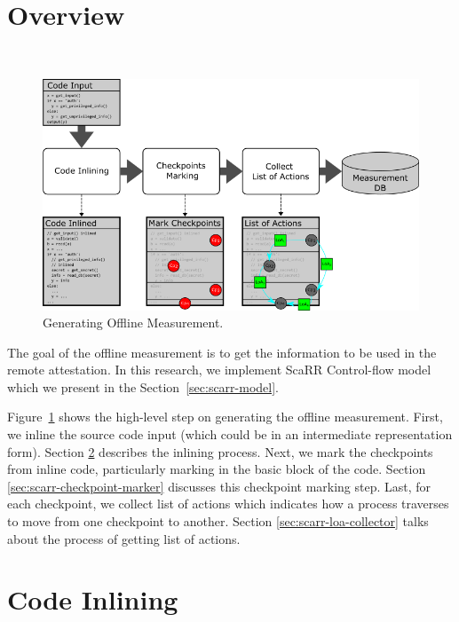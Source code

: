 \section{Overview}\
\label{sec:overview}

\begin{figure}[t]
    \centerline{\includegraphics[scale=.75]{Figures/04/scarr-overview.png}}
    \caption{Generating Offline Measurement.}
    \label{fig:scarr-overview}
\end{figure}

The goal of the offline measurement is to get the information to be used in the
remote attestation. In this research, we implement ScaRR Control-flow
model~\cite{toffaliniScaRRScalableRuntime2019} which we present in the
Section~\ref{sec:scarr-model}. 

Figure~\ref{fig:scarr-overview} shows the high-level step on generating the
offline measurement. First, we inline the source code input (which could be in
an intermediate representation form). Section \ref{sec:code-inlining} describes
the inlining process. Next, we mark the checkpoints from inline code,
particularly marking in the basic block of the code. Section
\ref{sec:scarr-checkpoint-marker} discusses this checkpoint marking step. Last,
for each checkpoint, we collect list of actions which indicates how a process
traverses to move from one checkpoint to another. Section
\ref{sec:scarr-loa-collector} talks about the process of getting list of
actions.

\section{Code Inlining}
\label{sec:code-inlining}


